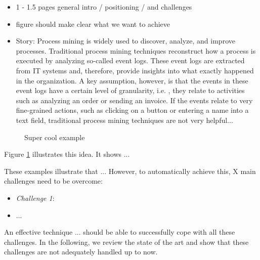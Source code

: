  \begin{itemize}
\item 1 - 1.5 pages general intro / positioning / and challenges
\item figure should make clear what we want to achieve
\item Story: Process mining is widely used to discover, analyze, and improve processes. Traditional process mining techniques reconstruct how a process is executed by analyzing so-called event logs. These event logs are extracted from IT systems and, therefore, provide insights into what exactly happened in the organization. A key assumption, however, is that the events in these event logs have a certain level of granularity, i.e. , they relate to activities such as analyzing an order or sending an invoice. If the events relate to very fine-grained actions, such as clicking on a button or entering a name into a text field, traditional process mining techniques are not very helpful... 
\end{itemize}


\begin{figure}[h!]
\centering
\caption{Super cool example}
\label{fig:example}
\end{figure}

Figure \ref{fig:example} illustrates this idea. It shows ... 

These examples illustrate that ...  However, to automatically achieve this, X main challenges need to be overcome: 

\begin{itemize}
\item \textit{Challenge 1}: 
\item ...
\end{itemize}

An effective technique ... should be able to successfully cope with all these challenges. In the following, we review the state of the art and show that these challenges are not adequately handled up to now.